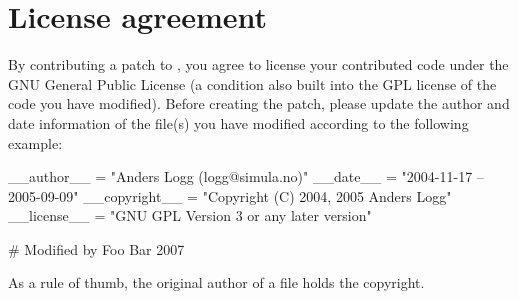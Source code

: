 

\section{License agreement}

By contributing a patch to \package{}, you agree to license your
contributed code under the GNU General Public License (a condition
also built into the GPL license of the code you have modified). Before
creating the patch, please update the author and date information of
the file(s) you have modified according to the following example:

\begin{code}
__author__ = "Anders Logg (logg@simula.no)"
__date__ = "2004-11-17 -- 2005-09-09"
__copyright__ = "Copyright (C) 2004, 2005 Anders Logg"
__license__  = "GNU GPL Version 3 or any later version"

# Modified by Foo Bar 2007
\end{code}

As a rule of thumb, the original author of a file holds the copyright.
